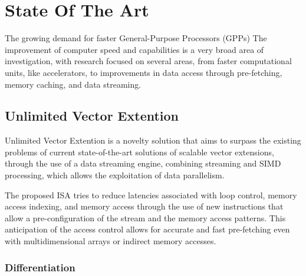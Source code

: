
\chapter{State Of The Art}
\label{chapter:state_art}

The growing demand for faster General-Purpose Processors (GPPs)  The improvement of computer speed and capabilities is a very broad area of investigation, with research focused on several areas, from faster computational units, like accelerators, to improvements in data access through pre-fetching, memory caching, and data streaming.





\section{Unlimited Vector Extention}

Unlimited Vector Extention is a novelty solution that aims to surpass the existing problems of current state-of-the-art solutions of scalable vector extensions, through the use of a data streaming engine, combining streaming and SIMD processing, which allows the exploitation of data parallelism.


The proposed ISA tries to reduce latencies associated with loop control, memory access indexing, and memory access through the use of new instructions that allow a pre-configuration of the stream and the memory access patterns. 
This anticipation of the access control allows for accurate and fast pre-fetching even with multidimensional arrays or indirect memory accesses. 


\subsection{Differentiation}


